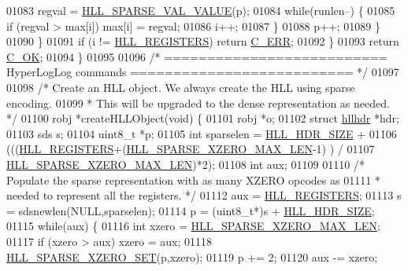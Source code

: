 \begin{DoxyCode}
{{01083                 regval = \hyperlink{hyperloglog_8c_ad36de263468a9ce3b1409743b8da64d7}{HLL\_SPARSE\_VAL\_VALUE}(p);
01084                 \textcolor{keywordflow}{while}(runlen--) \{
01085                     \textcolor{keywordflow}{if} (regval > max[i]) max[i] = regval;
01086                     i++;
01087                 \}
01088                 p++;
01089             \}
01090         \}
01091         \textcolor{keywordflow}{if} (i != \hyperlink{hyperloglog_8c_aa053beb90136828dcb46545c7445fc36}{HLL\_REGISTERS}) \textcolor{keywordflow}{return} \hyperlink{server_8h_af98ac28d5f4d23d7ed5985188e6fb7d1}{C\_ERR};
01092     \}
01093     \textcolor{keywordflow}{return} \hyperlink{server_8h_a303769ef1065076e68731584e758d3e1}{C\_OK};
01094 \}
01095 
01096 \textcolor{comment}{/* ========================== HyperLogLog commands ========================== */}
01097 
01098 \textcolor{comment}{/* Create an HLL object. We always create the HLL using sparse encoding.}
01099 \textcolor{comment}{ * This will be upgraded to the dense representation as needed. */}
01100 robj *createHLLObject(\textcolor{keywordtype}{void}) \{
01101     robj *o;
01102     \textcolor{keyword}{struct} \hyperlink{structhllhdr}{hllhdr} *hdr;
01103     sds s;
01104     uint8\_t *p;
01105     \textcolor{keywordtype}{int} sparselen = \hyperlink{hyperloglog_8c_af04dc163054c4c79b0e6c93057b4032f}{HLL\_HDR\_SIZE} +
01106                     (((\hyperlink{hyperloglog_8c_aa053beb90136828dcb46545c7445fc36}{HLL\_REGISTERS}+(\hyperlink{hyperloglog_8c_a63a340a0d93270bd5ac0c1c7343408e6}{HLL\_SPARSE\_XZERO\_MAX\_LEN}-1)
      ) /
01107                      \hyperlink{hyperloglog_8c_a63a340a0d93270bd5ac0c1c7343408e6}{HLL\_SPARSE\_XZERO\_MAX\_LEN})*2);
01108     \textcolor{keywordtype}{int} aux;
01109 
01110     \textcolor{comment}{/* Populate the sparse representation with as many XZERO opcodes as}
01111 \textcolor{comment}{     * needed to represent all the registers. */}
01112     aux = \hyperlink{hyperloglog_8c_aa053beb90136828dcb46545c7445fc36}{HLL\_REGISTERS};
01113     s = sdsnewlen(NULL,sparselen);
01114     p = (uint8\_t*)s + \hyperlink{hyperloglog_8c_af04dc163054c4c79b0e6c93057b4032f}{HLL\_HDR\_SIZE};
01115     \textcolor{keywordflow}{while}(aux) \{
01116         \textcolor{keywordtype}{int} xzero = \hyperlink{hyperloglog_8c_a63a340a0d93270bd5ac0c1c7343408e6}{HLL\_SPARSE\_XZERO\_MAX\_LEN};
01117         \textcolor{keywordflow}{if} (xzero > aux) xzero = aux;
01118         \hyperlink{hyperloglog_8c_a1e40105f1b438075006c8b38b07f7198}{HLL\_SPARSE\_XZERO\_SET}(p,xzero);
01119         p += 2;
01120         aux -= xzero;
}}
\end{DoxyCode}
